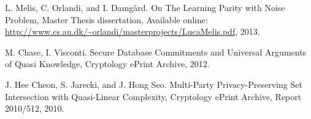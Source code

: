 \documentclass[dvips,12pt]{article}
\begin{document}
\begin{thebibliography}{99}
	L. Melis, C. Orlandi, and I. Damg{\aa}rd. 
	On The Learning Parity with Noise Problem,
	Master Thesis dissertation,
	Available online: {\url{http://www.cs.au.dk/~orlandi/masterprojects/LucaMelis.pdf}},
	2013.

	M. Chase, I. Visconti.
	Secure Database Commitments and Universal Arguments of Quasi Knowledge,
	Cryptology ePrint Archive,
	2012.
		
J. Hee Cheon, S. Jarecki, and J. Hong Seo.
Multi-Party Privacy-Preserving Set Intersection with Quasi-Linear Complexity,
Cryptology ePrint Archive, Report 2010/512,
2010.


\end{thebibliography}
\end{document}
